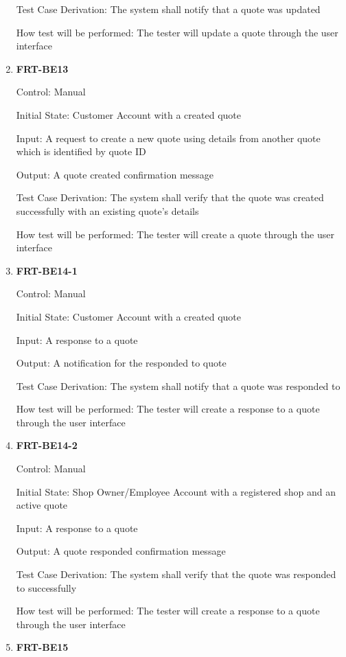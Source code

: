 \documentclass[12pt, titlepage]{article}
\begin{document}
\begin{enumerate}
	      Test Case Derivation: The system shall notify that a quote was updated

	      How test will be performed: The tester will update a quote through the user interface

	\item \textbf{FRT-BE13}

	      Control: Manual

	      Initial State: Customer Account with a created quote

	      Input: A request to create a new quote using details from another quote which is identified by
	      quote ID

	      Output: A quote created confirmation message

	      Test Case Derivation: The system shall verify that the quote was created successfully with an
	      existing quote's details

	      How test will be performed: The tester will create a quote through the user interface

	\item \textbf{FRT-BE14-1}

	      Control: Manual

	      Initial State: Customer Account with a created quote

	      Input: A response to a quote

	      Output: A notification for the responded to quote

	      Test Case Derivation: The system shall notify that a quote was responded to

	      How test will be performed: The tester will create a response to a quote through the user interface

	\item \textbf{FRT-BE14-2}

	      Control: Manual

	      Initial State: Shop Owner/Employee Account with a registered shop and an active quote

	      Input: A response to a quote

	      Output: A quote responded confirmation message

	      Test Case Derivation: The system shall verify that the quote was responded to successfully

	      How test will be performed: The tester will create a response to a quote through the user interface

	\item \textbf{FRT-BE15}


\end{enumerate}
\end{document}

